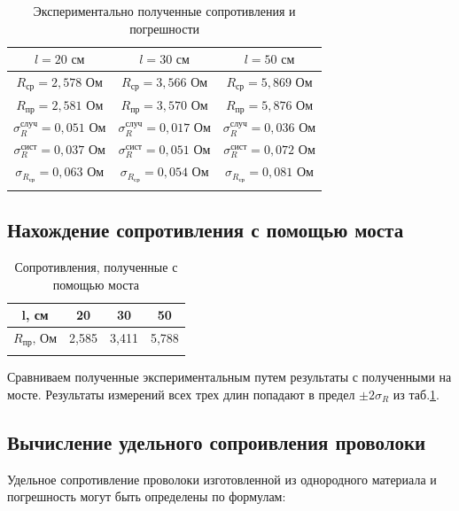 \documentclass[a4paper, 12pt]{article}
\begin{document}
	\begin{longtable}[H]{|c||c||c|}
		\hline
		$l = 20 \text{ см}$ & $l = 30 \text{ см}$ & $l = 50 \text{ см}$ \\
		\hline
		$R_\text{ср} = 2,578 \text{ Ом}$ & $R_\text{ср} = 3,566 \text{ Ом}$ & $R_\text{ср} = 5,869 \text{ Ом}$ \\
		\hline
		$R_\text{пр} = 2,581 \text{ Ом}$ & $R_\text{пр} = 3,570 \text{ Ом}$ & $R_\text{пр} = 5,876 \text{ Ом}$\\
		\hline
		$\sigma_R^\text{случ} = 0,051\text{ Ом}$ & $\sigma_R^\text{случ} = 0,017\text{ Ом}$ & $\sigma_R^\text{случ} = 0,036\text{ Ом}$ \\
		\hline
		$\sigma_R^\text{сист} = 0,037 \text{ Ом}$ & $\sigma_R^\text{сист} = 0,051 \text{ Ом}$ & $\sigma_R^\text{сист} = 0,072 \text{ Ом}$ \\
		\hline
		$\sigma_{R_\text{ср}} = 0,063 \text{ Ом}$ & $\sigma_{R_\text{ср}} = 0,054 \text{ Ом}$ & $\sigma_{R_\text{ср}} = 0,081 \text{ Ом}$ \\
		\hline
		
		\caption{Экспериментально полученные сопротивления и погрешности}
		\label{R}
	\end{longtable}
	
	\subsection{Нахождение сопротивления с помощью моста}
	
	\begin{longtable}[H]{|c|c|c|c|}
		\hline
		l, см & 20 & 30 & 50 \\
		\hline
		$R_\text{пр} \text{, Ом}$ & 2,585 & 3,411 & 5,788 \\
		\hline
		
		\caption{Сопротивления, полученные с помощью моста}
		\label{most}
	\end{longtable}
	
	Сравниваем полученные экспериментальным путем результаты с полученными на мосте. Результаты измерений всех трех длин попадают в предел $\pm2\sigma_R$ из таб.\ref{R}.
	
	\subsection{Вычисление удельного сопроивления проволоки}
	
	Удельное сопротивление проволоки изготовленной из однородного материала и погрешность могут быть определены по формулам:
	
\end{document}
